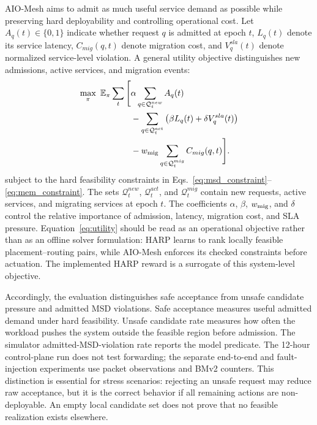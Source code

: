 \documentclass[final,5p]{elsarticle}
\newcommand{\rev}[1]{\textcolor{revisiongreen}{#1}}
\let\newrev\rev
\begin{document}
AIO-Mesh aims to admit as much useful service demand as possible while preserving hard deployability and controlling operational cost. Let \(A_q(t)\in\{0,1\}\) indicate whether request \(q\) is admitted at epoch \(t\), \(L_q(t)\) denote its service latency, \(C_{mig}(q,t)\) denote migration cost, and \(V_q^{sla}(t)\) denote normalized service-level violation. \rev{A general utility objective distinguishes new admissions, active services, and migration events:}
\begin{equation}
\rev{\begin{aligned}
\max_{\pi}\ \mathbb{E}_{\pi}\sum_t\Bigg[
&\alpha\sum_{q\in\mathcal{Q}_t^{new}}A_q(t)\\
&-\sum_{q\in\mathcal{Q}_t^{act}}\big(\beta L_q(t)+\delta V_q^{sla}(t)\big)\\
&-w_{\rm mig}\sum_{q\in\mathcal{Q}_t^{mig}}C_{mig}(q,t)
\Bigg].
\end{aligned}}
\label{eq:utility}
\end{equation}
subject to the hard feasibility constraints in Eqs.~\eqref{eq:msd_constraint}--\eqref{eq:mem_constraint}. \newrev{The sets \(\mathcal{Q}_t^{new}\), \(\mathcal{Q}_t^{act}\), and \(\mathcal{Q}_t^{mig}\) contain new requests, active services, and migrating services at epoch \(t\).} The coefficients \(\alpha\), \(\beta\), \(w_{\rm mig}\), and \(\delta\) control the relative importance of admission, latency, migration cost, and SLA pressure. Equation~\eqref{eq:utility} should be read as an operational objective rather than as an offline solver formulation: HARP learns to rank \rev{locally feasible placement--routing pairs}, while AIO-Mesh enforces \rev{its checked constraints} before actuation. \rev{The implemented HARP reward is a surrogate of this system-level objective.}

Accordingly, the evaluation distinguishes safe acceptance from unsafe candidate pressure and admitted MSD violations. Safe acceptance measures useful admitted demand under hard feasibility. Unsafe candidate rate measures how often the workload pushes the system outside the feasible region before admission. \newrev{The simulator admitted-MSD-violation rate reports the model predicate. The 12-hour control-plane run does not test forwarding; the separate end-to-end and fault-injection experiments use packet observations and BMv2 counters.} This distinction is essential for stress scenarios: rejecting an unsafe request may reduce raw acceptance, but it is the correct behavior if all remaining actions are non-deployable. \rev{An empty local candidate set does not prove that no feasible realization exists elsewhere.}
\end{document}
